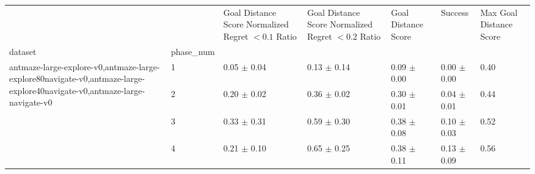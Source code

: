 \begin{tabular}{lllllll}
\toprule
 &  & Goal Distance Score Normalized Regret $< 0.1$ Ratio & Goal Distance Score Normalized Regret $< 0.2$ Ratio & Goal Distance Score & Success & Max Goal Distance Score \\
dataset & phase_num &  &  &  &  &  \\
\midrule
\multirow[t]{4}{*}{antmaze-large-explore-v0,antmaze-large-explore80navigate-v0,antmaze-large-explore40navigate-v0,antmaze-large-navigate-v0} & 1 & 0.05 $\pm$ 0.04 & 0.13 $\pm$ 0.14 & 0.09 $\pm$ 0.00 & 0.00 $\pm$ 0.00 & 0.40 \\
 & 2 & 0.20 $\pm$ 0.02 & 0.36 $\pm$ 0.02 & 0.30 $\pm$ 0.01 & 0.04 $\pm$ 0.01 & 0.44 \\
 & 3 & 0.33 $\pm$ 0.31 & 0.59 $\pm$ 0.30 & 0.38 $\pm$ 0.08 & 0.10 $\pm$ 0.03 & 0.52 \\
 & 4 & 0.21 $\pm$ 0.10 & 0.65 $\pm$ 0.25 & 0.38 $\pm$ 0.11 & 0.13 $\pm$ 0.09 & 0.56 \\
\cline{1-7}
\bottomrule
\end{tabular}
